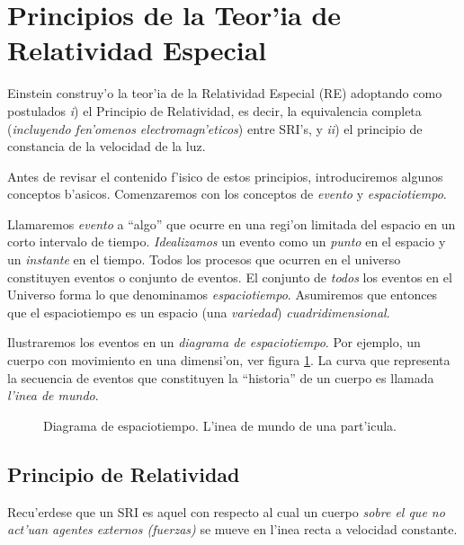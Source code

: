\section{Principios de la Teor'ia de Relatividad Especial}
Einstein construy'o la teor'ia de la Relatividad Especial (RE) adoptando como postulados \textit{i}) el Principio de Relatividad, es decir, la equivalencia completa (\textit{incluyendo fen'omenos electromagn'eticos}) entre SRI's,  y \textit{ii}) el principio de constancia de la velocidad de la luz.

Antes de revisar el contenido f'isico de estos principios, introduciremos algunos conceptos b'asicos. Comenzaremos con los conceptos de \textit{evento} y \textit{espaciotiempo}.

Llamaremos \textit{evento} a ``algo'' que ocurre en una regi'on limitada del
espacio en un corto intervalo de tiempo. \textit{Idealizamos} un evento como un \textit{punto} en el espacio y un \textit{instante} en el tiempo. Todos los procesos que ocurren en el universo constituyen eventos o conjunto de eventos.
El conjunto de \textit{todos} los eventos en el Universo forma lo que
denominamos \textit{espaciotiempo}. Asumiremos que entonces que el espaciotiempo es un espacio (una \textit{variedad}) \textit{cuadridimensional}.

Ilustraremos los eventos en un \textit{diagrama de espaciotiempo}. Por ejemplo, un cuerpo con movimiento en una dimensi'on, ver figura \ref{TER1}. La curva que representa la secuencia de eventos que constituyen la ``historia'' de un cuerpo es llamada \textit{l'inea de mundo}.

\begin{figure}[!h]
\centerline{}
\caption{Diagrama de espaciotiempo. L'inea de mundo de una part'icula.}
\label{TER1}
\end{figure}

\subsection{Principio de Relatividad}
\begin{quotation}
\end{quotation}

Recu'erdese que un SRI es aquel con respecto al cual un cuerpo \textit{sobre el que no act'uan agentes externos (fuerzas)} se mueve en l'inea recta a velocidad
constante.


